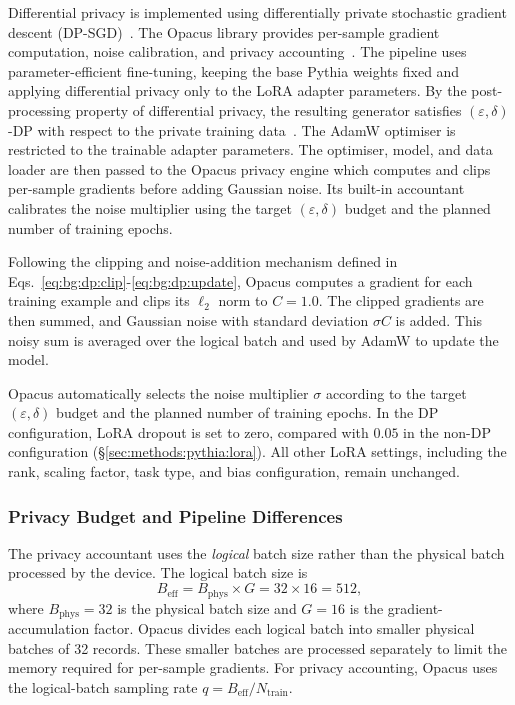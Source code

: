 Differential privacy is implemented using differentially private
stochastic gradient descent (DP-SGD)~\cite{Abadi2016DPSGD}. The Opacus
library provides per-sample gradient computation, noise calibration, and
privacy accounting~\cite{Yousefpour2021Opacus}.
The pipeline uses parameter-efficient fine-tuning, keeping the base Pythia
weights fixed and applying differential privacy only to the LoRA adapter
parameters. By the post-processing property of differential privacy, the
resulting generator satisfies $(\varepsilon,\delta)$-DP with respect to the
private training data~\cite{Yu2022DPFT}. The AdamW 
optimiser is restricted to the trainable adapter parameters. The
optimiser, model, and data loader are then passed to the Opacus privacy engine which 
computes and clips per-sample gradients before adding Gaussian noise.
Its built-in accountant calibrates the noise multiplier using the target
$(\varepsilon,\delta)$ budget and the planned number of training epochs.

Following the clipping and noise-addition mechanism defined in
Eqs.~\ref{eq:bg:dp:clip}-\ref{eq:bg:dp:update}, Opacus computes a gradient
for each training example and clips its $\ell_2$ norm to $C=1.0$. The clipped
gradients are then summed, and Gaussian noise with standard deviation
$\sigma C$ is added. This noisy sum is averaged over the logical batch and
used by AdamW to update the model.

Opacus automatically selects the noise multiplier $\sigma$ according to the
target $(\varepsilon,\delta)$ budget and the planned number of training
epochs. In the DP configuration, LoRA dropout is set to zero, compared with
$0.05$ in the non-DP configuration
(\S\ref{sec:methods:pythia:lora}). All other LoRA settings, including the rank,
scaling factor, task type, and bias configuration, remain unchanged.

\subsubsection{Privacy Budget and Pipeline Differences}
\label{sec:methods:pythia-dp:epsilon}%
\label{sec:methods:pythia-dp:diff}%

The privacy accountant uses the \emph{logical} batch size rather than the
physical batch processed by the device. The logical batch size is
\begin{equation*}
  B_{\mathrm{eff}}
  = B_{\mathrm{phys}} \times G
  = 32 \times 16
  = 512,
\end{equation*}
where $B_{\mathrm{phys}}=32$ is the physical batch size and $G=16$ is
the gradient-accumulation factor. Opacus divides each logical batch into
smaller physical batches of 32 records. These smaller batches are processed
separately to limit the memory required for per-sample gradients. For privacy
accounting, Opacus uses the logical-batch sampling rate
$q=B_{\mathrm{eff}}/N_{\mathrm{train}}$.

